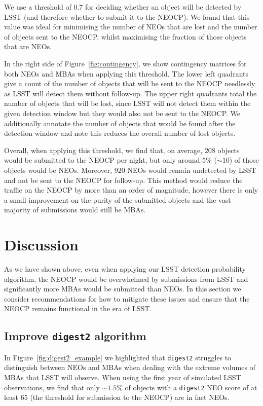 \documentclass[twocolumn]{aastex631}
\newcommand{\dig}{\texttt{digest2}}
\newcommand{\npernightAlg}{208}
\newcommand{\purityAlg}{5}
\newcommand{\purityAlgRaw}{10}
\newcommand{\neoLostAlg}{920}
\newcommand{\thresholdAlg}{0.7}
\begin{document}
We use a threshold of $\thresholdAlg{}$ for deciding whether an object will be detected by LSST (and therefore whether to submit it to the NEOCP). We found that this value was ideal for minimising the number of NEOs that are lost and the number of objects sent to the NEOCP, whilst maximising the fraction of those objects that are NEOs.

In the right side of Figure~\ref{fig:contingency}, we show contingency matrices for both NEOs and MBAs when applying this threshold. The lower left quadrants give a count of the number of objects that will be sent to the NEOCP needlessly as LSST will detect them without follow-up. The upper right quadrants total the number of objects that will be lost, since LSST will not detect them within the given detection window but they would also not be sent to the NEOCP. We additionally annotate the number of objects that would be found after the detection window and note this reduces the overall number of lost objects.

Overall, when applying this threshold, we find that, on average, $\npernightAlg{}$ objects would be submitted to the NEOCP per night, but only around $\purityAlg{}\%$ (${\sim}\purityAlgRaw{}$) of those objects would be NEOs. Moreover, $\neoLostAlg{}$ NEOs would remain undetected by LSST and not be sent to the NEOCP for follow-up. This method would reduce the traffic on the NEOCP by more than an order of magnitude, however there is only a small improvement on the purity of the submitted objects and the vast majority of submissions would still be MBAs. 

\section{Discussion} \label{sec:discussion}
As we have shown above, even when applying our LSST detection probability algorithm, the NEOCP would be overwhelmed by submissions from LSST and significantly more MBAs would be submitted than NEOs. In this section we consider recommendations for how to mitigate these issues and ensure that the NEOCP remains functional in the era of LSST.

\subsection{Improve \dig{} algorithm}
In Figure~\ref{fig:digest2_example} we highlighted that \dig{} struggles to distinguish between NEOs and MBAs when dealing with the extreme volumes of MBAs that LSST will observe. When using the first year of simulated LSST observations, we find that only ${\sim}1.5\%$ of objects with a \dig{} NEO score of at least 65 (the threshold for submission to the NEOCP) are in fact NEOs.
\end{document}
